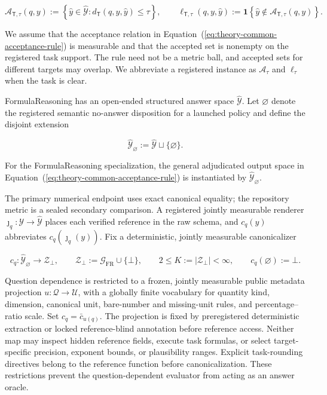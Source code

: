 \documentclass[10pt]{article} %
\renewcommand{\eqref}[1]{\textup{(\ref{#1})}}
\providecommand{\1}{\mathbf{1}}  %
\theoremstyle{remark}
\theoremstyle{definition}
\begin{document}
\begin{equation}
\mathcal A_{\mathsf T,\tau}(q,y)
:=
\left\{
\widehat y\in\widehat{\mathcal Y}:
d_{\mathsf T}(q,y,\widehat y)\leq\tau
\right\},
\qquad
\ell_{\mathsf T,\tau}(q,y,\widehat y)
:=
\mathbf 1\!\left\{
\widehat y\notin\mathcal A_{\mathsf T,\tau}(q,y)
\right\}.
\label{eq:theory-common-acceptance-rule}
\end{equation}

We assume that the acceptance relation in Equation~\eqref{eq:theory-common-acceptance-rule} is measurable and that the accepted set is nonempty on the registered task support. The rule need not be a metric ball, and accepted sets for different targets may overlap. We abbreviate a registered instance as $\mathcal A_\tau$ and $\ell_\tau$ when the task is clear.

FormulaReasoning has an open-ended structured answer space $\widehat{\mathcal Y}$. Let $\varnothing$ denote the registered semantic no-answer disposition for a launched policy and define the disjoint extension

\begin{equation}
\widehat{\mathcal Y}_{\varnothing}
:=
\widehat{\mathcal Y}\sqcup\{\varnothing\}.
\end{equation}

For the FormulaReasoning specialization, the general adjudicated output space in Equation~\eqref{eq:theory-common-acceptance-rule} is instantiated by $\widehat{\mathcal Y}_{\varnothing}$.

The primary numerical endpoint uses exact canonical equality; the
repository metric is a sealed secondary comparison. A registered jointly
measurable renderer $\jmath_q:\mathcal Y\to\widehat{\mathcal Y}$ places
each verified reference in the raw schema, and $c_q(y)$ abbreviates
$c_q(\jmath_q(y))$. Fix a deterministic,
jointly measurable canonicalizer

\begin{equation}
c_q:
\widehat{\mathcal Y}_{\varnothing}
\longrightarrow
\mathcal Z_{\bot},
\qquad
\mathcal Z_{\bot}
:=
\mathcal G_{\mathrm{FR}}\cup\{\bot\},
\qquad
2\leq K:=|\mathcal Z_{\bot}|<\infty,
\qquad
c_q(\varnothing):=\bot.
\label{eq:theory-canonicalizer}
\end{equation}

Question dependence is restricted to a frozen, jointly measurable public
metadata projection $u:\mathcal Q\to\mathcal U$, with a globally finite
vocabulary for quantity kind, dimension, canonical unit, bare-number and
missing-unit rules, and percentage--ratio scale. Set
$c_q=\bar c_{u(q)}$. The projection is fixed by preregistered deterministic
extraction or locked reference-blind annotation before reference access.
Neither map may inspect hidden reference fields, execute task formulas,
or select target-specific precision, exponent bounds, or plausibility
ranges. Explicit task-rounding directives belong to the reference
function before canonicalization. These restrictions prevent the
question-dependent evaluator from acting as an answer oracle.
\end{document}
